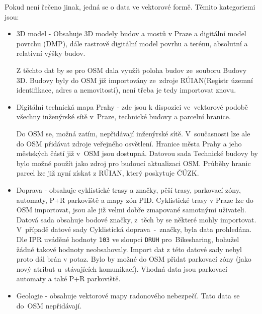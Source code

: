 Pokud není řečeno jinak, jedná se o data ve vektorové formě.
Těmito kategoriemi jsou:

\begin{itemize}
    \item   3D model - Obsahuje 3D modely budov a mostů v Praze a
            digitální model povrchu (DMP), dále rastrově digitální
            model povrhu a terénu, absolutní a relativní výšky budov.

            Z těchto dat by se pro OSM dala využít poloha budov
            ze~souboru Budovy 3D. Budovy byly do OSM již importovány
            ze~zdroje RÚIAN(Registr územní identifikace, adres a nemovitostí),
            není třeba je tedy importovat znovu.

    \item   Digitální technická mapa Prahy - zde jsou k dispozici
            ve~vektorové podobě všechny inženýrské sítě v~Praze,
            technické budovy a parcelní hranice.

            Do OSM se, možná zatím, nepřidávají inženýrské sítě.
            V~současnosti lze ale do OSM přidávat zdroje veřejného osvětlení.
            Hranice města Prahy a jeho městských
            částí již v~OSM jsou dostupná. Datovou sada Technické budovy by bylo
            možné použít jako zdroj pro budoucí aktualizaci OSM.
            Průběhy hranic parcel lze již nyní získat z RÚIAN, který poskytuje ČÚZK. 

    \item   Doprava - obsahuje cyklistické trasy a značky, pěší trasy,
            parkovací zóny, automaty, P+R parkoviště a mapy zón PID.
            Cyklistické trasy v Praze lze do OSM importovat, jsou ale
            již velmi dobře zmapované samotnými uživateli. Datová sada
            obsahuje bodové značky, z~těch by se některé mohly
            importovat. V~případě datové sady 
            Cyklistická doprava~-~značky, byla data prohledána. Dle IPR
            uváděné hodnoty {\tt 103} ve sloupci {\tt DRUH}
            pro~Bikesharing, bohužel žádné takové hodnoty
            neobsahovaly. Import dat z této datové sady nebyl proto
            dál brán v potaz. Bylo by možné do OSM přidat parkovací
            zóny (jako nový atribut u~stávajících komunikací).
            Vhodná data jsou parkovací automaty a také P+R parkoviště.

    \item   Geologie - obsahuje vektorové mapy radonového nebezpečí.
            Tato data se do~OSM nepřidávají.


\end{itemize}
